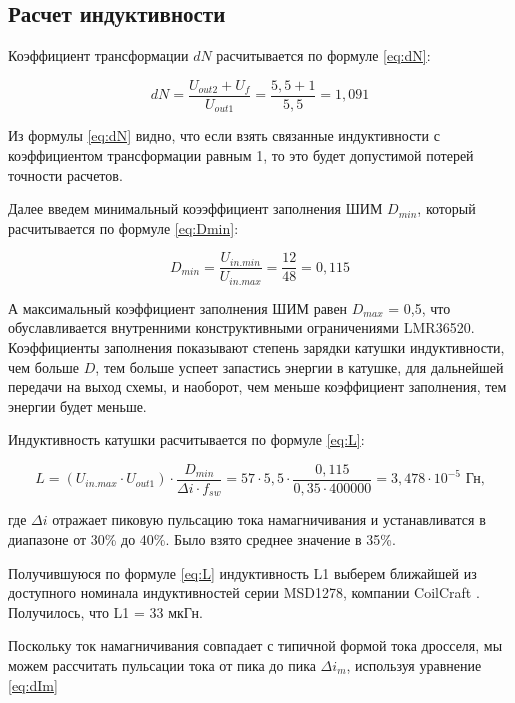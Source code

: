 \subsection{Расчет индуктивности}
\hspace{1cm} 

Коэффициент трансформации $dN$ расчитывается по формуле \ref{eq:dN}:

\begin{equation}
    dN = \frac{U_{out2} + U_{f}}{ U_{out1}} = \frac{5,5 + 1}{5,5} = 1,091
    \label{eq:dN}
\end{equation}

Из формулы \ref{eq:dN} видно, что если взять связанные индуктивности с коэффициентом 
трансформации равным 1, то это будет допустимой потерей точности расчетов. 

Далее введем минимальный коээффициент заполнения ШИМ $D_{min}$, который расчитывается по 
формуле \ref{eq:Dmin}:

\begin{equation}
    D_{min} = \frac{U_{in.min}}{U_{in.max}} = \frac{12}{48} = 0,115
    \label{eq:Dmin}
\end{equation}

А максимальный коэффициент заполнения ШИМ равен $D_{max}$ = 0,5, что обуславливается внутренними
конструктивными ограничениями LMR36520. Коэффициенты заполнения показывают степень зарядки 
катушки индуктивности, чем больше $D$, тем больше успеет запастись энергии в катушке, для дальнейшей
передачи на выход схемы, и наоборот, чем меньше коэффициент заполнения, тем энергии будет меньше. 

Индуктивность катушки расчитывается по формуле \ref{eq:L}:

\begin{equation}
    L =
    (U_{in. max} \cdot U_{out1}) \cdot \frac{D_{min}}{\Delta i \cdot f_{sw}} = 
    57 \cdot 5,5 \cdot \frac{0,115}{0,35 \cdot 400000} =
     3,478 \cdot 10^{-5}  \text{ Гн,}
    \label{eq:L}
\end{equation}

где $\Delta i$ отражает пиковую пульсацию тока намагничивания и устанавливатся
в диапазоне от 30\% до 40\%. Было взято среднее значение в 35\%. 

Получившуюся по формуле \ref{eq:L} индуктивность L1 выберем ближайшей из доступного номинала 
индуктивностей серии MSD1278, компании CoilCraft \cite{MSD1278:datasheet}. Получилось, что L1 = 33 мкГн. 

Поскольку ток намагничивания совпадает с типичной формой тока дросселя, мы можем рассчитать пульсации 
тока от пика до пика $\varDelta i_{m}$, используя уравнение \ref{eq:dIm}

